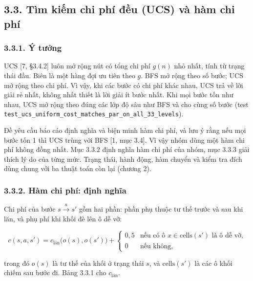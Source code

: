 \subsection{3.3. Tìm kiếm chi phí đều (UCS) và hàm chi phí}

\subsubsection{3.3.1. Ý tưởng}

UCS {[}7, §3.4.2{]} luôn mở rộng nút có tổng chi phí \(g(n)\) nhỏ nhất, tính từ trạng thái đầu. Biên là một hàng đợi ưu tiên theo \(g\). BFS mở rộng theo số bước; UCS mở rộng theo chi phí. Vì vậy, khi các bước có chi phí khác nhau, UCS trả về lời giải rẻ nhất, không nhất thiết là lời giải ít bước nhất. Khi mọi bước tốn như nhau, UCS mở rộng theo đúng các lớp độ sâu như BFS và cho cùng số bước (test \texttt{test\_\allowbreak{}ucs\_\allowbreak{}uniform\_\allowbreak{}cost\_\allowbreak{}matches\_\allowbreak{}par\_\allowbreak{}on\_\allowbreak{}all\_\allowbreak{}33\_\allowbreak{}levels}).

Đề yêu cầu báo cáo định nghĩa và biện minh hàm chi phí, và lưu ý rằng nếu mọi bước tốn 1 thì UCS trùng với BFS {[}1, mục 3.4{]}. Vì vậy nhóm dùng một hàm chi phí không đồng nhất. Mục 3.3.2 định nghĩa hàm chi phí của nhóm, mục 3.3.3 giải thích lý do của từng mức. Trạng thái, hành động, hàm chuyển và kiểm tra đích dùng chung với ba thuật toán còn lại (chương 2).

\subsubsection{3.3.2. Hàm chi phí: định nghĩa}

Chi phí của bước \(s \xrightarrow{a} s'\) gồm hai phần: phần phụ thuộc tư thế trước và sau khi lăn, và phụ phí khi khối đè lên ô dễ vỡ:

\[
c(s, a, s') = c_{\text{lăn}}\big(o(s), o(s')\big) + \begin{cases} 0{,}5 & \text{nếu có ô } x \in \text{cells}(s') \text{ là ô dễ vỡ,} \\ 0 & \text{nếu không,} \end{cases}
\]

trong đó \(o(s)\) là tư thế của khối ở trạng thái \(s\), và \(\text{cells}(s')\) là các ô khối chiếm sau bước đi. Bảng 3.3.1 cho \(c_{\text{lăn}}\).


